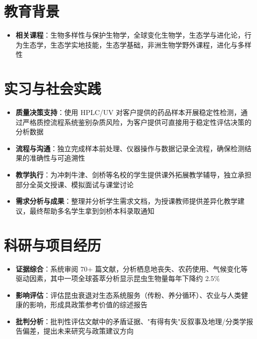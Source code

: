 \documentclass{my-resume}
\begin{document}


\section{教育背景}
\begin{itemize}[parsep=0.2ex]
  \item \textbf{相关课程}：生物多样性与保护生物学，全球变化生物学，生态学与进化论，行为生态学，生态学实地技能，生态学基础，非洲生物学野外课程，进化与多样性
\end{itemize}

\section{实习与社会实践}
\begin{itemize}[parsep=0.2ex]
  \item \textbf{质量决策支持}：使用 HPLC/UV 对客户提供的药品样本开展稳定性检测，通过严格质控流程系统鉴别杂质风险，为客户提供可直接用于稳定性评估决策的分析数据
  \item \textbf{流程与沟通}：独立完成样本前处理、仪器操作与数据记录全流程，确保检测结果的准确性与可追溯性
\end{itemize}
\begin{itemize}[parsep=0.2ex]
  \item \textbf{教学执行}：为冲刺牛津、剑桥等名校的学生提供课外拓展教学辅导，独立承担部分全英文授课、模拟面试与课堂讨论
  \item \textbf{需求分析与成果}：整理并分析学生需求文档，为授课教师提供差异化教学建议，最终帮助多名学生拿到剑桥本科录取通知
\end{itemize}

\section{科研与项目经历}

\begin{itemize}[parsep=0.2ex]
  \item \textbf{证据综合}：系统审阅 70+ 篇文献，分析栖息地丧失、农药使用、气候变化等驱动因素，其中一项全球荟萃分析显示昆虫生物量每年下降约 2.5\%
  \item \textbf{影响评估}：评估昆虫衰退对生态系统服务（传粉、养分循环）、农业与人类健康的影响，形成具政策参考价值的综述报告
  \item \textbf{批判分析}：批判性评估文献中的矛盾证据、"有得有失"反叙事及地理/分类学报告偏差，提出未来研究与政策建议方向
\end{itemize}
\end{document}
